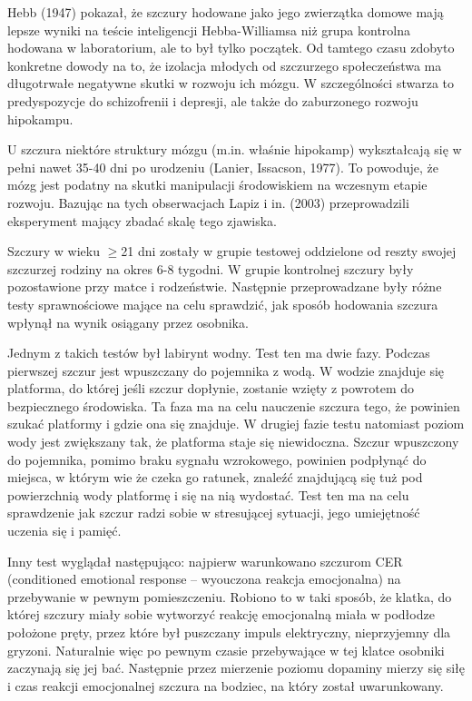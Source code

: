 \documentclass{psychol}
\begin{document}
Hebb (1947) pokazał, że szczury hodowane jako jego zwierzątka domowe mają lepsze wyniki na teście inteligencji Hebba-Williamsa niż grupa kontrolna hodowana w laboratorium, ale to był tylko początek. Od tamtego czasu zdobyto konkretne dowody na to, że izolacja młodych od szczurzego społeczeństwa ma długotrwałe negatywne skutki w rozwoju ich mózgu. W szczególności stwarza to predyspozycje do schizofrenii i depresji, ale także do zaburzonego rozwoju hipokampu.

U szczura niektóre struktury mózgu (m.in. właśnie hipokamp) wykształcają się w pełni nawet 35-40 dni po urodzeniu (Lanier, Issacson, 1977). To powoduje, że mózg jest podatny na skutki manipulacji środowiskiem na wczesnym etapie rozwoju. Bazując na tych obserwacjach Lapiz i in. (2003) przeprowadzili eksperyment mający zbadać skalę tego zjawiska.

Szczury w wieku $\geq$21 dni zostały w grupie testowej oddzielone od reszty swojej szczurzej rodziny na okres 6-8 tygodni. W grupie kontrolnej szczury były pozostawione przy matce i rodzeństwie. Następnie przeprowadzane były różne testy sprawnościowe mające na celu sprawdzić, jak sposób hodowania szczura wpłynął na wynik osiągany przez osobnika.

Jednym z takich testów był labirynt wodny. Test ten ma dwie fazy. Podczas pierwszej szczur jest wpuszczany do pojemnika z wodą. W wodzie znajduje się platforma, do której jeśli szczur dopłynie, zostanie wzięty z powrotem do bezpiecznego środowiska. Ta faza ma na celu nauczenie szczura tego, że powinien szukać platformy i gdzie ona się znajduje. W drugiej fazie testu natomiast poziom wody jest zwiększany tak, że platforma staje się niewidoczna. Szczur wpuszczony do pojemnika, pomimo braku sygnału wzrokowego, powinien podpłynąć do miejsca, w którym wie że czeka go ratunek, znaleźć znajdującą się tuż pod powierzchnią wody platformę i się na nią wydostać. Test ten ma na celu sprawdzenie jak szczur radzi sobie w stresującej sytuacji, jego umiejętność uczenia się i pamięć.

Inny test wyglądał następująco: najpierw warunkowano szczurom CER (conditioned emotional response -- wyouczona reakcja emocjonalna) na przebywanie w pewnym pomieszczeniu. Robiono to w taki sposób, że klatka, do której szczury miały sobie wytworzyć reakcję emocjonalną miała w podłodze położone pręty, przez które był puszczany impuls elektryczny, nieprzyjemny dla gryzoni. Naturalnie więc po pewnym czasie przebywające w tej klatce osobniki zaczynają się jej bać. Następnie przez mierzenie poziomu dopaminy mierzy się siłę i czas reakcji emocjonalnej szczura na bodziec, na który został uwarunkowany.
\end{document}
